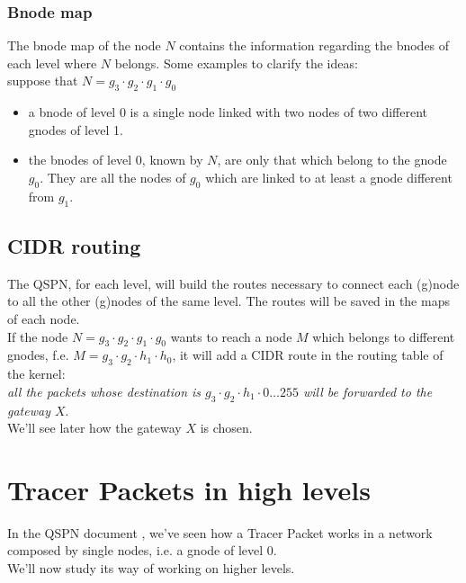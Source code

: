 \documentclass[a4paper]{article}
\begin{document}
\subsubsection{Bnode map}
The bnode map of the node $N$  contains the information regarding the bnodes
of each level where $N$ belongs.
Some examples to clarify the ideas:\\

suppose that $N = g_3\cdot g_2\cdot g_1 \cdot g_0$
\begin{itemize}
	\item a bnode of level 0 is a single node linked with two nodes of two
		different gnodes of level 1.
	\item the bnodes of level 0, known by $N$, are only that which belong
		to the gnode $g_0$. They are all the nodes of $g_0$ which are
		linked to at least a gnode different from $g_1$.
\end{itemize}

\subsection{CIDR routing}
The QSPN, for each level, will build the routes necessary to connect each
(g)node to all the other (g)nodes of the same level. The routes will be saved
in the maps of each node.\\

If the node $N=g_3\cdot g_2\cdot g_1 \cdot g_0$ wants to reach a node $M$ which
belongs to different gnodes, f.e. $M=g_3\cdot g_2\cdot h_1 \cdot h_0$, it will
add a CIDR\cite{CIDR} route in the routing table of the kernel:\\
\emph{all the packets whose destination is $g_3\cdot g_2\cdot h_1 \cdot 0\dots
255$ will be forwarded to the gateway $X$}.\\

We'll see later how the gateway $X$ is chosen.

\section{Tracer Packets in high levels}
In the QSPN document \cite{qspndoc}, we've seen how a Tracer Packet works in a
network composed by single nodes, i.e. a gnode of level 0. \\
We'll now study its way of working on higher levels.
\end{document}

